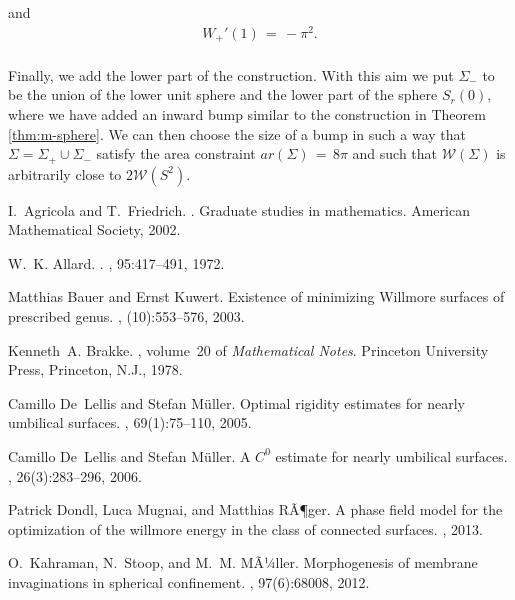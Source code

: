 \documentclass[reqno,makeidx,12pt]{amsart}
\theoremstyle{note}
\theoremstyle{definition}
\begin{document}
and
\begin{gather}
  W_+'(1)\,=\, -\pi^2. \label{eq:div-W}
\end{gather}
{\mbox{}\\\underline{}}
Finally, we add the lower part of the construction. With this aim we put
${\Sigma}_-$ to be the union of the lower unit sphere and the
lower part of the sphere $S_r(0)$, where we have added an inward bump
similar to the construction in Theorem \ref{thm:m-sphere}.
We can then choose the size of a bump in such a way that
$\Sigma=\Sigma_+\cup\Sigma_-$ satisfy the area constraint 
${ar}(\Sigma)\,=\, 8\pi$ and such that ${\mathcal{W}}(\Sigma)$ is arbitrarily
close to $2{\mathcal{W}}(S^2)$.

\begin{thebibliography}{10}

I.~Agricola and T.~Friedrich.
.
\newblock Graduate studies in mathematics. American Mathematical Society, 2002.

W.~K. Allard.
.
, 95:417--491, 1972.

Matthias Bauer and Ernst Kuwert.
\newblock Existence of minimizing {W}illmore surfaces of prescribed genus.
, (10):553--576, 2003.

Kenneth~A. Brakke.
, volume~20 of
  {\em Mathematical Notes}.
\newblock Princeton University Press, Princeton, N.J., 1978.

Camillo De~Lellis and Stefan M{\"u}ller.
\newblock Optimal rigidity estimates for nearly umbilical surfaces.
, 69(1):75--110, 2005.

Camillo De~Lellis and Stefan M{\"u}ller.
\newblock A {$C^0$} estimate for nearly umbilical surfaces.
, 26(3):283--296,
  2006.

Patrick Dondl, Luca Mugnai, and Matthias RÃ¶ger.
\newblock A phase field model for the optimization of the willmore energy in
  the class of connected surfaces.
, 2013.

O.~Kahraman, N.~Stoop, and M.~M. MÃ¼ller.
\newblock Morphogenesis of membrane invaginations in spherical confinement.
, 97(6):68008, 2012.


\end{thebibliography}
\end{document}
